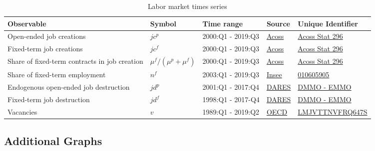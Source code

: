 \begin{table}[H]
\begin{center}
\begin{tabular}{p{2.5cm}llll}
\toprule
Observable & Symbol & Time range & Source & Unique Identifier\\
\midrule
Open-ended job creations & $jc^p$ & 2000:Q1 - 2019:Q3 & \href{https://www.acoss.fr}{Acoss} &  \href{https://www.acoss.fr/home/observatoire-economique/publications/acoss-stat/2019/acoss-stat-n296.html}{Acoss Stat 296}\\
Fixed-term job creations & $jc^f$ & 2000:Q1 - 2019:Q3 & \href{https://www.acoss.fr}{Acoss} &  \href{https://www.acoss.fr/home/observatoire-economique/publications/acoss-stat/2019/acoss-stat-n296.html}{Acoss Stat 296}\\
Share of fixed-term contracts in job creation & $\mu^f / \left( \mu^p + \mu^f \right)$ & 2000:Q1 - 2019:Q3 & \href{https://www.acoss.fr}{Acoss} &  \href{https://www.acoss.fr/home/observatoire-economique/publications/acoss-stat/2019/acoss-stat-n296.html}{Acoss Stat 296}\\
Share of fixed-term employment & $n^f$ &  2003:Q1 - 2019:Q3 & \href{https://www.insee.fr/}{Insee} & \href{https://www.insee.fr/fr/statistiques/serie/010605905}{010605905}\\
Endogenous open-ended job destruction & $jd^p$ & 2001:Q1 - 2017:Q4 & \href{https://dares.travail-emploi.gouv.fr/}{DARES} & \href{https://dares.travail-emploi.gouv.fr/dares-etudes-et-statistiques/statistiques-de-a-a-z/article/les-mouvements-de-main-d-oeuvre}{DMMO - EMMO}\\
Fixed-term job destruction & $jd^f$ & 1998:Q1 - 2017-Q4 & \href{https://dares.travail-emploi.gouv.fr/}{DARES} & \href{https://dares.travail-emploi.gouv.fr/dares-etudes-et-statistiques/statistiques-de-a-a-z/article/les-mouvements-de-main-d-oeuvre}{DMMO - EMMO}\\
Vacancies & $v$ & 1989:Q1 - 2019:Q2 & \href{http://www.oecd.org/}{OECD} & \href{https://fred.stlouisfed.org/series/LMJVTTNVFRQ647S}{LMJVTTNVFRQ647S}\\
\bottomrule
\end{tabular}
\caption{Labor market times series}
\end{center}
\end{table}

\subsection{Additional Graphs}

